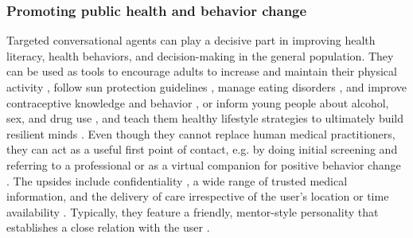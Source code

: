 \subsubsection{Promoting public health and behavior change}\label{PublicHealth}
Targeted conversational agents can play a decisive part in improving health literacy, health behaviors, and decision-making in the general population. They can be used as tools to encourage adults to increase and maintain their physical activity \cite{FitTrack2003, walkingincentives2020, exerciseandsun2018}, follow sun protection guidelines \cite{exerciseandsun2018}, manage eating disorders \cite{Tessa2022}, and improve contraceptive knowledge and behavior \cite{contraceptionreview2024}, or inform young people about alcohol, sex, and drug use \cite{youngedu2011}, and teach them healthy lifestyle strategies to ultimately build resilient minds \cite{healthylifestyleadolescents2024}. Even though they cannot replace human medical practitioners, they can act as a useful first point of contact, e.g. by doing initial screening and referring to a professional \cite{alcoholism2016} or as a virtual companion for positive behavior change \cite{FitTrack2003}. The upsides include confidentiality \cite{mentalhealthbarriers2017}, a wide range of trusted medical information, and the delivery of care irrespective of the user's location or time availability \cite{FitTrack2003, exerciseandsun2018, alcoholism2016}. Typically, they feature a friendly, mentor-style personality that establishes a close relation with the user \cite{FitTrack2003, alcoholism2016}.

